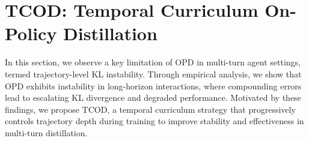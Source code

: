 \documentclass{article} %
\newcommand{\ours}{TCOD\xspace}
\begin{document}



\section{\ours: Temporal Curriculum On-Policy Distillation}
In this section, we observe a key limitation of OPD in multi-turn agent settings, termed trajectory-level KL instability. 
Through empirical analysis, we show that OPD exhibits instability in long-horizon interactions, where compounding errors lead to escalating KL divergence and degraded performance.
Motivated by these findings, we propose \ours, a temporal curriculum strategy that progressively controls trajectory depth during training to improve stability and effectiveness in multi-turn distillation.
\end{document}
